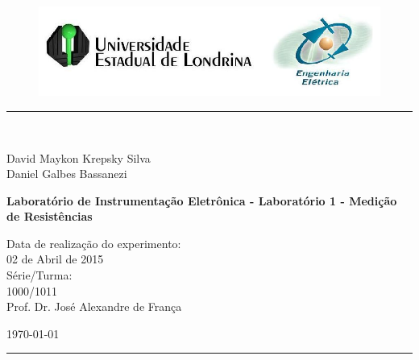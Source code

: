 \begin{titlepage}
\begin{center}
\begin{figure}[h]
\includegraphics[scale=0.76]{Imagens/topdotitulo.png}
\end{figure}
\rule{\columnwidth}{1.5mm}
\

\large David Maykon Krepsky Silva\\
\large Daniel Galbes Bassanezi

\vspace{4cm}
{\bf \Large Laboratório de Instrumentação Eletrônica - Laboratório 1 - Medição de Resistências}
\vspace{3.5cm}

\begin{flushright}
Data de realização do experimento:\\
02 de Abril de 2015\\
Série/Turma:\\
1000/1011\\
Prof. Dr. José Alexandre de França
\end{flushright}

\vspace{3.2cm}
\today

\rule{\columnwidth}{1.3mm}
\end{center}
\end{titlepage}